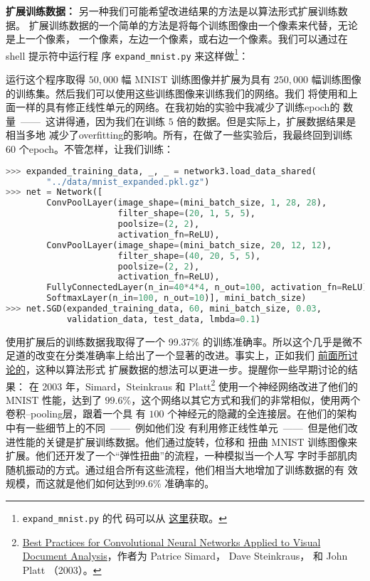 \textbf{扩展训练数据：} 另一种我们可能希望改进结果的方法是以算法形式扩展训练数据。
扩展训练数据的一个简单的方法是将每个训练图像由一个像素来代替，无论是上一个像素，
一个像素，左边一个像素，或右边一个像素。我们可以通过在 shell 提示符中运行程
序 \lstinline!expand_mnist.py! 来这样做\footnote{\lstinline!expand_mnist.py! 的代
  码可以从%
  \href{https://github.com/mnielsen/neural-networks-and-deep-learning/blob/master/src/expand_mnist.py}{%
    这里}获取。}：

运行这个程序取得 $50,000$ 幅 MNIST 训练图像并扩展为具有
$250,000$ 幅训练图像的训练集。然后我们可以使用这些训练图像来训练我们的网络。我们
将使用和上面一样的具有修正线性单元的网络。在我初始的实验中我减少了训练\gls*{epoch}的
数量~——~这讲得通，因为我们在训练 $5$ 倍的数据。但是实际上，扩展数据结果是相当多地
减少了\gls*{overfitting}的影响。所有，在做了一些实验后，我最终回到训练
$60$ 个\gls*{epoch}。不管怎样，让我们训练：
\begin{lstlisting}[language=Python]
>>> expanded_training_data, _, _ = network3.load_data_shared(
        "../data/mnist_expanded.pkl.gz")
>>> net = Network([
        ConvPoolLayer(image_shape=(mini_batch_size, 1, 28, 28), 
                      filter_shape=(20, 1, 5, 5), 
                      poolsize=(2, 2), 
                      activation_fn=ReLU),
        ConvPoolLayer(image_shape=(mini_batch_size, 20, 12, 12), 
                      filter_shape=(40, 20, 5, 5), 
                      poolsize=(2, 2), 
                      activation_fn=ReLU),
        FullyConnectedLayer(n_in=40*4*4, n_out=100, activation_fn=ReLU),
        SoftmaxLayer(n_in=100, n_out=10)], mini_batch_size)
>>> net.SGD(expanded_training_data, 60, mini_batch_size, 0.03, 
            validation_data, test_data, lmbda=0.1)
\end{lstlisting}

使用扩展后的训练数据我取得了一个 99.37\% 的训练准确率。所以这个几乎是微不足道的改变在分类准确率上给出了一个显著的改进。事实上，正如我们%
\hyperref[sec:other_techniques_for_regularization]{前面所讨论的}，这种以算法形式
扩展数据的想法可以更进一步。提醒你一些早期讨论的结果：
在 2003 年，Simard，Steinkraus 和
Platt\footnote{\href{http://dx.doi.org/10.1109/ICDAR.2003.1227801}{Best
    Practices for Convolutional Neural Networks Applied to Visual Document
    Analysis}，作者为 Patrice Simard， Dave Steinkraus， 和 John
  Platt （2003）。} 使用一个神经网络改进了他们的 MNIST 性能，达到了
$99.6$\%，这个网络以其它方式和我们的非常相似，使用两个卷积--\gls*{pooling}层，跟着一个具
有 $100$ 个神经元的隐藏的全连接层。在他们的架构中有一些细节上的不同~——~例如他们没
有利用修正线性单元~——~但是他们改进性能的关键是扩展训练数据。他们通过旋转，位移和
扭曲 MNIST 训练图像来扩展。他们还开发了一个“弹性扭曲”的流程，一种模拟当一个人写
字时手部肌肉随机振动的方式。通过组合所有这些流程，他们相当大地增加了训练数据的有
效规模，而这就是他们如何达到$99.6$\% 准确率的。


